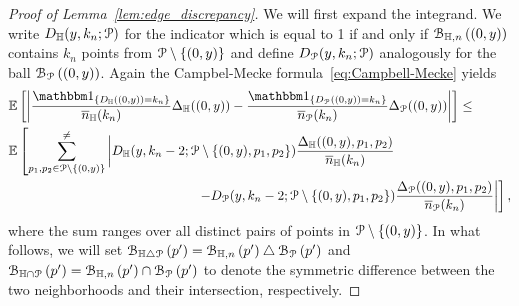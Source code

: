 \begin{proof}[Proof of Lemma~\ref{lem:edge_discrepancy}]
We will first expand the integrand. We write $D_{\mathbb{H}}(y,k_n;{\mathcal P})$ for the indicator 
which is equal to 1 if and only if ${\mathcal B}_{\mathbb{H},n}\left((0,y)\right)$ contains $k_n$ points from 
${\mathcal P} \setminus \{(0,y)\}$ and define $D_{{\mathcal P}}(y,k_n;{\mathcal P})$ analogously for the 
ball ${\mathcal B}_{{\mathcal P}}\left((0,y)\right)$. Again the Campbel-Mecke formula~\eqref{eq:Campbell-Mecke} yields
\begin{align*} 
 &\Exp{ \left| \frac{\ind{D_\H((0,y)) = k_n}}{\expH} \Delta_\H ((0,y) )
        - \frac{\ind{D_\Pcal((0,y)) = k_n}}{\expP}  \Delta_\Pcal ((0,y))
        \right|}\leq \\
 & {\mathbb E} \left[ \sum_{p_1,p_2 \in \Pcal \setminus \{(0,y)\}}^{\not =} 
  \left| D_{\H}(y,k_n-2; \Pcal \setminus \{ (0,y),p_1,p_2 \}) \frac{\Delta_\H ((0,y),p_1,p_2)}{\expH} \right. \right.\\
  & \hspace{5cm} 
\left. \left. -   D_{\Pcal} (y,k_n-2;\Pcal \setminus \{(0,y),p_1,p_2\}) \frac{\Delta_{\Pcal} ((0,y),p_1,p_2)}{\expP}
   \right| \right],
\end{align*}
where the sum ranges over all distinct pairs of points in ${\mathcal P} \setminus \{ (0,y)\}$.
In what follows, we will set ${\mathcal B}_{\mathbb{H} \bigtriangleup {\mathcal P}}\left(p'\right) = {\mathcal B}_{\mathbb{H},n}\left(p'\right) \bigtriangleup {\mathcal B}_{{\mathcal P}}\left(p'\right)$ 
and ${\mathcal B}_{\mathbb{H} \cap {\mathcal P}}\left(p'\right) ={\mathcal B}_{\mathbb{H},n}\left(p'\right) \cap {\mathcal B}_{{\mathcal P}}\left(p'\right)$ to denote the symmetric difference between the two neighborhoods and their intersection, respectively. 


\end{proof}
